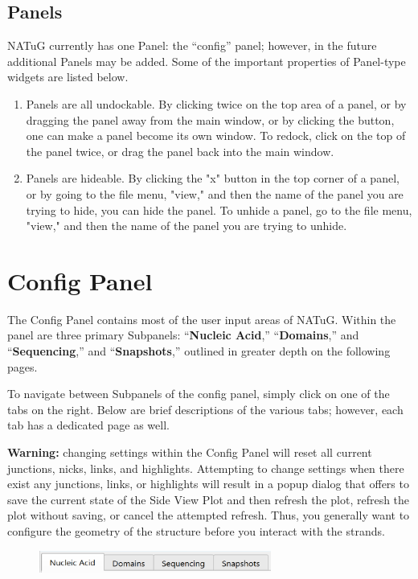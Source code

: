 \documentclass[titlepage]{article}
\begin{document}
\subsection{Panels}
NATuG currently has one Panel: the ``config'' panel; however, in the future additional Panels may be added. Some of the important properties of Panel-type widgets are listed below.

\begin{enumerate}
	\item Panels are all undockable. By clicking twice on the top area of a panel, or by dragging the panel away from the main window, or by clicking the  button, one can make a panel become its own window. To redock, click on the top of the panel twice, or drag the panel back into the main window. 
	
	\item Panels are hideable. By clicking the "x" button in the top corner of a panel, or by going to the file menu, "view," and then the name of the panel you are trying to hide, you can hide the panel. To unhide a panel, go to the file menu, "view," and then the name of the panel you are trying to unhide. 
\end{enumerate}

\section{Config Panel} \label{section:config-panel}	
The Config Panel contains most of the user input areas of NATuG. Within the panel are three primary Subpanels: ``\textbf{Nucleic Acid},'' ``\textbf{Domains},'' and ``\textbf{Sequencing},'' and ``\textbf{Snapshots},'' outlined in greater depth on the following pages.

To navigate between Subpanels of the config panel, simply click on one of the tabs on the right. Below are brief descriptions of the various tabs; however, each tab has a dedicated page as well.

\textbf{Warning:} changing settings within the Config Panel will reset all current junctions, nicks, links, and highlights. Attempting to change settings when there exist any junctions, links, or highlights will result in a popup dialog that offers to save the current state of the Side View Plot and then refresh the plot, refresh the plot without saving, or cancel the attempted refresh. Thus, you generally want to configure the geometry of the structure before you interact with the strands.

\begin{figure}[H] \label{fig:nucleic-acid-tab-activated}
	\centering
	\includegraphics[width=3in]{"nucleic-acid-tab-activated.png"}
\end{figure}
\end{document}
